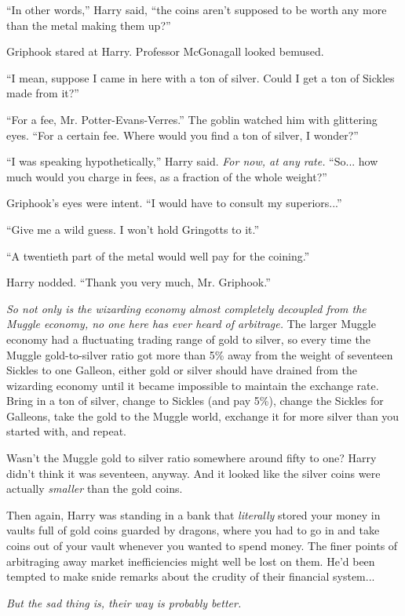 ``In other words,'' Harry said, ``the coins aren't supposed to be worth
any more than the metal making them up?''

Griphook stared at Harry. Professor McGonagall looked bemused.

``I mean, suppose I came in here with a ton of silver. Could I get a ton
of Sickles made from it?''

``For a fee, Mr. Potter-Evans-Verres.'' The goblin watched him with
glittering eyes. ``For a certain fee. Where would you find a ton of
silver, I wonder?''

``I was speaking hypothetically,'' Harry said. \emph{For now, at any
rate.} ``So... how much would you charge in fees, as a fraction of
the whole weight?''

Griphook's eyes were intent. ``I would have to consult my
superiors...''

``Give me a wild guess. I won't hold Gringotts to it.''

``A twentieth part of the metal would well pay for the coining.''

Harry nodded. ``Thank you very much, Mr. Griphook.''

\emph{So not only is the wizarding economy almost completely decoupled
from the Muggle economy, no one here has ever heard of arbitrage.} The
larger Muggle economy had a fluctuating trading range of gold to silver,
so every time the Muggle gold-to-silver ratio got more than 5\% away
from the weight of seventeen Sickles to one Galleon, either gold or
silver should have drained from the wizarding economy until it became
impossible to maintain the exchange rate. Bring in a ton of silver,
change to Sickles (and pay 5\%), change the Sickles for Galleons, take
the gold to the Muggle world, exchange it for more silver than you
started with, and repeat.

Wasn't the Muggle gold to silver ratio somewhere around fifty to one?
Harry didn't think it was seventeen, anyway. And it looked like the
silver coins were actually \emph{smaller} than the gold coins.

Then again, Harry was standing in a bank that \emph{literally} stored
your money in vaults full of gold coins guarded by dragons, where you
had to go in and take coins out of your vault whenever you wanted to
spend money. The finer points of arbitraging away market inefficiencies
might well be lost on them. He'd been tempted to make snide remarks
about the crudity of their financial system...

\emph{But the sad thing is, their way is probably better.}

